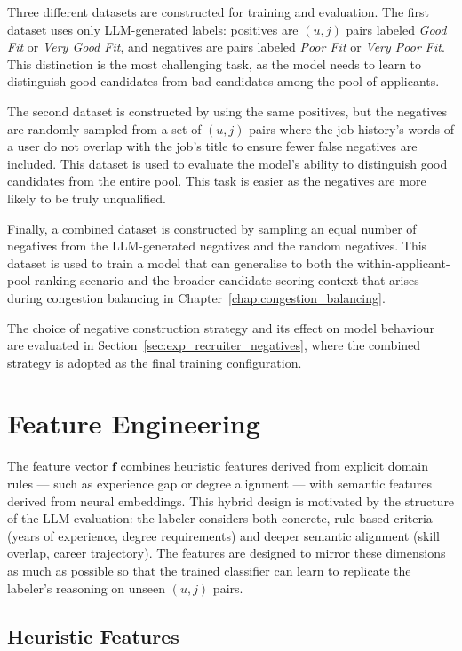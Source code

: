 Three different datasets are constructed for training and evaluation. The first dataset uses only \gls{LLM}-generated labels: positives 
are $(u,j)$ pairs labeled \textit{Good Fit} or \textit{Very Good Fit}, 
and negatives are pairs labeled \textit{Poor Fit} or \textit{Very Poor Fit}. This distinction is the most challenging task, as the model needs to learn to distinguish good candidates from bad candidates among the pool of applicants.

The second dataset is constructed by using the same positives, but the negatives are randomly sampled from a set of $(u,j)$ pairs where the job history's words of a user do not overlap with the job's title to ensure fewer false negatives are included. This dataset is used to evaluate the model's ability to distinguish good candidates from the entire pool. This task is easier as the negatives are more likely to be truly unqualified.  

Finally, a combined dataset is constructed by sampling an equal number of negatives from the \gls{LLM}-generated negatives and the random negatives. This dataset is used to train a model that can generalise to both the within-applicant-pool ranking scenario and the broader candidate-scoring context that arises during congestion balancing in Chapter~\ref{chap:congestion_balancing}.

The choice of negative construction strategy and its effect on model 
behaviour are evaluated in Section~\ref{sec:exp_recruiter_negatives}, 
where the combined strategy is adopted as the final training configuration.

\section{Feature Engineering}
\label{sec:recruiter_features}

The feature vector $\mathbf{f}$ combines heuristic features derived from explicit domain rules --- such as experience gap or degree alignment --- with semantic features derived from neural embeddings. This hybrid design is motivated by the structure of the \gls{LLM} evaluation: the labeler considers both concrete, rule-based criteria (years of experience, degree requirements) and deeper semantic alignment (skill overlap, career trajectory). The features are designed to mirror these dimensions as much as possible so that the trained classifier can learn to replicate the labeler's reasoning on unseen $(u,j)$ pairs.

\subsection{Heuristic Features}
\label{sec:recruiter_heuristic}

